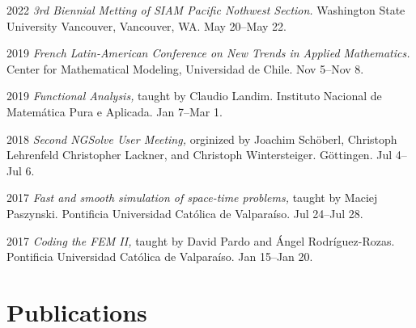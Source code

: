 \documentclass[12pt,letterpaper]{report}
\begin{document}
    \begin{tablist}

	\item[2022] \tab \emph{3rd Biennial Metting of SIAM Pacific Nothwest Section.} Washington State University Vancouver, Vancouver, WA. May 20--May 22.

        \item[2019] \tab \emph{French Latin-American Conference on New Trends in Applied Mathematics.} Center for Mathematical Modeling, Universidad de Chile. Nov 5--Nov 8.

        \item[2019] \tab \emph{Functional Analysis,} taught by Claudio Landim. Instituto Nacional de Matem\'atica Pura e Aplicada. Jan 7--Mar 1.
        
        \item[2018] \tab \emph{Second NGSolve User Meeting,} orginized by Joachim Schöberl, Christoph Lehrenfeld
        Christopher Lackner, and Christoph Wintersteiger. Göttingen. Jul 4--Jul 6. 

        
        \item[2017] \tab \emph{Fast and smooth simulation of space-time problems,} taught by Maciej Paszynski. Pontificia Universidad Cat\'olica de Valpara\'iso. Jul 24--Jul 28.
        
        \item[2017] \tab \emph{Coding the FEM II,} taught by David Pardo and \'Angel Rodr\'iguez-Rozas. Pontificia Universidad Cat\'olica de Valpara\'iso. Jan 15--Jan 20. 

        

    \end{tablist}

    \section*{Publications}
\end{document}
